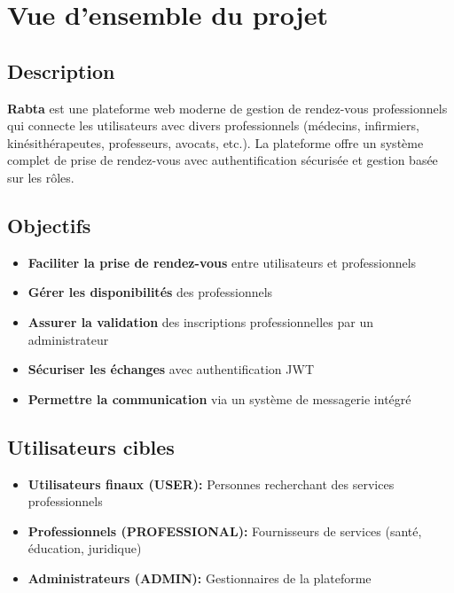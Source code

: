 \documentclass[12pt,a4paper]{article}
\begin{document}
\newpage
\tableofcontents
\newpage

\section{Vue d'ensemble du projet}

\subsection{Description}

\textbf{Rabta} est une plateforme web moderne de gestion de rendez-vous professionnels qui connecte les utilisateurs avec divers professionnels (médecins, infirmiers, kinésithérapeutes, professeurs, avocats, etc.). La plateforme offre un système complet de prise de rendez-vous avec authentification sécurisée et gestion basée sur les rôles.

\subsection{Objectifs}

\begin{itemize}
    \item \textbf{Faciliter la prise de rendez-vous} entre utilisateurs et professionnels
    \item \textbf{Gérer les disponibilités} des professionnels
    \item \textbf{Assurer la validation} des inscriptions professionnelles par un administrateur
    \item \textbf{Sécuriser les échanges} avec authentification JWT
    \item \textbf{Permettre la communication} via un système de messagerie intégré
\end{itemize}

\subsection{Utilisateurs cibles}

\begin{itemize}
    \item \textbf{Utilisateurs finaux (USER):} Personnes recherchant des services professionnels
    \item \textbf{Professionnels (PROFESSIONAL):} Fournisseurs de services (santé, éducation, juridique)
    \item \textbf{Administrateurs (ADMIN):} Gestionnaires de la plateforme
\end{itemize}
\end{document}
